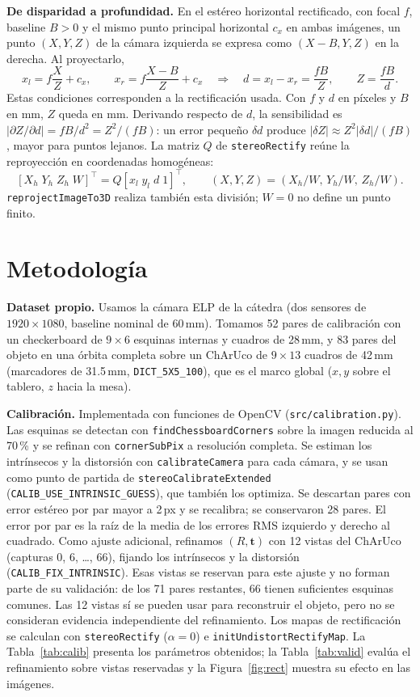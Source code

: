 \documentclass[10pt,a4paper]{article}
\begin{document}
\textbf{De disparidad a profundidad.} En el estéreo horizontal rectificado, con focal $f$,
baseline $B>0$ y el mismo punto principal horizontal $c_x$ en ambas imágenes, un punto
$(X,Y,Z)$ de la cámara izquierda se expresa como $(X-B,Y,Z)$ en la derecha. Al proyectarlo,
\begin{equation}
x_l=f\frac{X}{Z}+c_x,\qquad x_r=f\frac{X-B}{Z}+c_x
\quad\Longrightarrow\quad d=x_l-x_r=\frac{fB}{Z},\qquad Z=\frac{fB}{d}.
\label{eq:depth}
\end{equation}
Estas condiciones corresponden a la rectificación usada. Con $f$ y $d$ en píxeles y $B$
en mm, $Z$ queda en mm. Derivando respecto de $d$, la sensibilidad es
$|\partial Z/\partial d|=fB/d^2=Z^2/(fB)$: un error pequeño $\delta d$ produce
$|\delta Z|\approx Z^2|\delta d|/(fB)$, mayor para puntos lejanos.
La matriz $Q$ de \texttt{stereoRectify} reúne la reproyección en coordenadas homogéneas:
\[
[X_h\;Y_h\;Z_h\;W]^\top=Q[x_l\;y_l\;d\;1]^\top,\qquad
(X,Y,Z)=(X_h/W,\,Y_h/W,\,Z_h/W).
\]
\texttt{reprojectImageTo3D} realiza también esta división; $W=0$ no define un punto finito.

\clearpage
\section{Metodología}

\textbf{Dataset propio.} Usamos la cámara ELP de la cátedra (dos sensores de $1920\times1080$,
baseline nominal de 60\,mm). Tomamos 52 pares de calibración con un checkerboard de
$9\times6$ esquinas internas y cuadros de 28\,mm, y 83 pares del objeto en una órbita completa
sobre un ChArUco de $9\times13$ cuadros de 42\,mm (marcadores de 31.5\,mm, \texttt{DICT\_5X5\_100}),
que es el marco global ($x,y$ sobre el tablero, $z$ hacia la mesa).

\textbf{Calibración.} Implementada con funciones de OpenCV (\texttt{src/calibration.py}).
Las esquinas se detectan con \texttt{findChessboardCorners} sobre la imagen reducida al 70\,\% y
se refinan con \texttt{cornerSubPix} a resolución completa. Se estiman los intrínsecos y la
distorsión con \texttt{calibrateCamera} para cada cámara, y se usan como punto de partida de
\texttt{stereoCalibrateExtended} (\texttt{CALIB\_USE\_INTRINSIC\_GUESS}), que también los optimiza.
Se descartan pares con error estéreo por par mayor a 2\,px y se recalibra; se conservaron 28 pares.
El error por par es la raíz de la media de los errores RMS izquierdo y derecho al cuadrado.
Como ajuste adicional, refinamos $(R,\mathbf{t})$ con 12 vistas del ChArUco (capturas 0, 6, \dots,
66), fijando los intrínsecos y la distorsión (\texttt{CALIB\_FIX\_INTRINSIC}). Esas vistas se
reservan para este ajuste y no forman parte de su validación: de los 71 pares restantes,
66 tienen suficientes esquinas comunes. Las 12 vistas sí se pueden usar para reconstruir
el objeto, pero no se consideran evidencia independiente del refinamiento.
Los mapas de rectificación se calculan con \texttt{stereoRectify} ($\alpha=0$) e
\texttt{initUndistortRectifyMap}. La Tabla~\ref{tab:calib} presenta los parámetros obtenidos;
la Tabla~\ref{tab:valid} evalúa el refinamiento sobre vistas reservadas y la
Figura~\ref{fig:rect} muestra su efecto en las imágenes.
\end{document}
